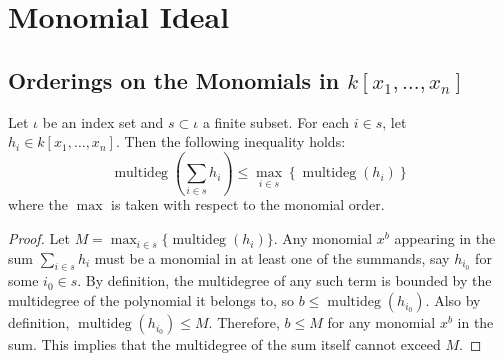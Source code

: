 \chapter{Monomial Ideal} 

\section{Orderings on the Monomials in $k[x_1,\ldots,x_n]$}


\begin{lemma}\label{lem:degree_sum_le} %
  \mathlibok
  Let $\iota$ be an index set and $s \subset \iota$ a finite subset. For each $i \in s$, let $h_i \in k[x_1,\dots,x_n]$. 
  Then the following inequality holds:
  \[
  \operatorname{multideg}\left(\sum_{i \in s} h_i\right) \le \max_{i \in s} \left\{ \operatorname{multideg}(h_i) \right\}
  \]
  where the $\max$ is taken with respect to the monomial order.
\end{lemma}
\begin{proof}
  \mathlibok
  Let $M = \max_{i \in s} \{ \operatorname{multideg}(h_i) \}$. 
  Any monomial $x^b$ appearing in the sum $\sum_{i \in s} h_i$ must be a monomial in at least one of the summands, say $h_{i_0}$ for some $i_0 \in s$.
  By definition, the multidegree of any such term is bounded by the multidegree of the polynomial it belongs to, so $b \le \operatorname{multideg}(h_{i_0})$.
  Also by definition, $\operatorname{multideg}(h_{i_0}) \le M$.
  Therefore, $b \le M$ for any monomial $x^b$ in the sum. This implies that the multidegree of the sum itself cannot exceed $M$.
\end{proof}

